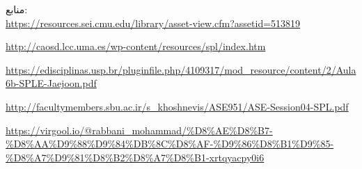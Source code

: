 منابع:\\

\url{https://resources.sei.cmu.edu/library/asset-view.cfm?assetid=513819}

\url{http://caosd.lcc.uma.es/wp-content/resources/spl/index.htm}

\url{https://edisciplinas.usp.br/pluginfile.php/4109317/mod_resource/content/2/Aula6b-SPLE-Jaejoon.pdf}

\url{http://facultymembers.sbu.ac.ir/s_khoshnevis/ASE951/ASE-Session04-SPL.pdf}

\url{https://virgool.io/@rabbani_mohammad/%D8%AE%D8%B7-%D8%AA%D9%88%D9%84%DB%8C%D8%AF-%D9%86%D8%B1%D9%85-%D8%A7%D9%81%D8%B2%D8%A7%D8%B1-xrtqyacpy0i6}
